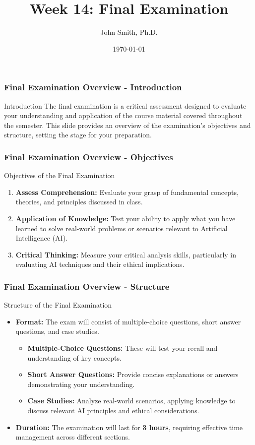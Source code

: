 \documentclass[aspectratio=169]{beamer}
\title[Week 14: Final Examination]{Week 14: Final Examination}
\author[]{John Smith, Ph.D.}
\institute[University Name]{
  Department of Computer Science\\
  University Name\\
  Email: email@university.edu\\
  Website: www.university.edu
}
\date{\today}
\begin{document}
\frame{\titlepage}

\begin{frame}[fragile]
    \frametitle{Final Examination Overview - Introduction}
    \begin{block}{Introduction}
        The final examination is a critical assessment designed to evaluate your understanding and application of the course material covered throughout the semester. This slide provides an overview of the examination's objectives and structure, setting the stage for your preparation.
    \end{block}
\end{frame}

\begin{frame}[fragile]
    \frametitle{Final Examination Overview - Objectives}
    \begin{block}{Objectives of the Final Examination}
        \begin{enumerate}
            \item \textbf{Assess Comprehension:} Evaluate your grasp of fundamental concepts, theories, and principles discussed in class.
            \item \textbf{Application of Knowledge:} Test your ability to apply what you have learned to solve real-world problems or scenarios relevant to Artificial Intelligence (AI).
            \item \textbf{Critical Thinking:} Measure your critical analysis skills, particularly in evaluating AI techniques and their ethical implications.
        \end{enumerate}
    \end{block}
\end{frame}

\begin{frame}[fragile]
    \frametitle{Final Examination Overview - Structure}
    \begin{block}{Structure of the Final Examination}
        \begin{itemize}
            \item \textbf{Format:} The exam will consist of multiple-choice questions, short answer questions, and case studies.
            \begin{itemize}
                \item \textbf{Multiple-Choice Questions:} These will test your recall and understanding of key concepts.
                \item \textbf{Short Answer Questions:} Provide concise explanations or answers demonstrating your understanding.
                \item \textbf{Case Studies:} Analyze real-world scenarios, applying knowledge to discuss relevant AI principles and ethical considerations.
            \end{itemize}
            \item \textbf{Duration:} The examination will last for \textbf{3 hours}, requiring effective time management across different sections.
        \end{itemize}
    \end{block}
\end{frame}
\end{document}
